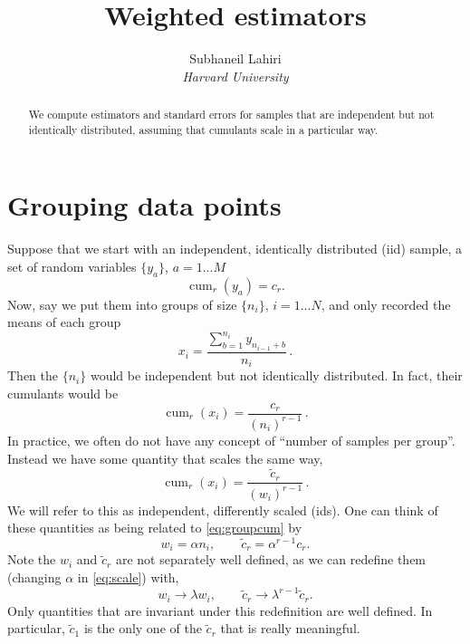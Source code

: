 \documentclass[12pt]{article}
\title{Weighted estimators}
\author{Subhaneil Lahiri
\\
%
%
\small{\emph{Harvard University}}
%
}
\DeclareMathOperator{\cum}{cum}
\newcommand{\tk}{\tilde c}
\begin{document}
\maketitle




\begin{abstract}  We compute estimators and standard errors for samples that are independent but not identically distributed, assuming that cumulants scale in a particular way.
\end{abstract}



\section{Grouping data points}

Suppose that we start with an independent, identically distributed (iid) sample, \ie a set of random variables $\{y_a\}$, $a=1...M$
%
\begin{equation}\label{eq:iid}
  \cum_r(y_a) = c_r.
\end{equation}
%
Now, say we put them into groups of size $\{n_i\}$, $i=1...N$, and only recorded the means of each group
%
\begin{equation}\label{eq:group}
  x_i = \frac{\sum_{b=1}^{n_i}y_{n_{i-1}+b}}{n_i}\,.
\end{equation}
%
Then the $\{n_i\}$ would be independent but not identically distributed. In fact, their cumulants would be
%
\begin{equation}\label{eq:groupcum}
  \cum_r(x_i) = \frac{c_r}{(n_i)^{r-1}}\,.
\end{equation}
%
In practice, we often do not have any concept of ``number of samples per group''. Instead we have some quantity that scales the same way, \ie
%
\begin{equation}\label{eq:scalecum}
  \cum_r(x_i) = \frac{\tk_r}{(w_i)^{r-1}}\,.
\end{equation}
%
We will refer to this as independent, differently scaled (ids). One can think of these quantities as being related to \eqref{eq:groupcum} by
%
\begin{equation}\label{eq:scale}
  w_i = \alpha n_i, \qquad \tk_r = \alpha^{r-1} c_r.
\end{equation}
%
Note the $w_i$ and $\tk_r$ are not separately well defined, as we can redefine them (changing $\alpha$ in \eqref{eq:scale}) with,
%
\begin{equation}\label{eq:rescale}
  w_i \to \lambda w_i, \qquad \tk_r \to \lambda^{r-1} \tk_r.
\end{equation}
%
Only quantities that are invariant under this redefinition are well defined. In particular, $\tk_1$ is the only one of the $\tk_r$ that is really meaningful.
\end{document}
